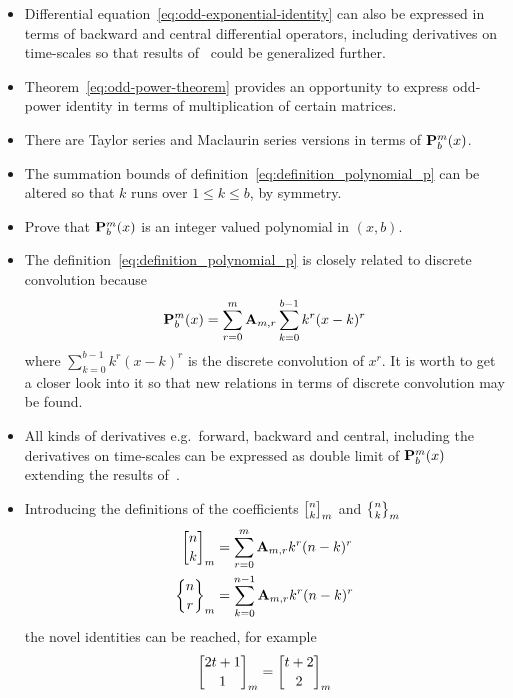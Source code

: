 \begin{itemize}
    \item Differential equation~\eqref{eq:odd-exponential-identity} can also be expressed in terms of backward
    and central differential operators, including derivatives on time-scales so that results of~\cite{study_on_partial_dynamic_eq_on_time_scales_with_poly_derivatives}
    could be generalized further.
    \item Theorem~\eqref{eq:odd-power-theorem} provides an opportunity to express odd-power identity
    in terms of multiplication of certain matrices.
    \item There are Taylor series and Maclaurin series versions in terms of ${\mathbf{P}}\sp{m} \sb{b}(x)$.
    \item The summation bounds of definition~\eqref{eq:definition_polynomial_p} can be altered so that
    $k$ runs over $1 \leq k \leq b$, by symmetry.
    \item Prove that ${\mathbf{P}}\sp{m} \sb{b}(x)$ is an integer valued polynomial in $(x,b)$.
    \item The definition~\eqref{eq:definition_polynomial_p} is closely related to discrete convolution because
    \begin{equation*}
        {\mathbf{P}}\sp{m} \sb{b}(x) = \sum_{r=0}^{m} {\mathbf{A}} \sb{m,r} \sum_{k=0}^{b-1} k^r(x-k)^r
    \end{equation*}
    where $\sum_{k=0}^{b-1} k^r(x-k)^r$ is the discrete convolution of $x^r$.
    It is worth to get a closer look into it so that new relations in terms of discrete convolution may be found.
    \item All kinds of derivatives e.g.\ forward, backward and central, including the derivatives on time-scales can be expressed
    as double limit of ${\mathbf{P}}\sp{m} \sb{b}(x)$ extending the results of~\cite{derivative_of_polynomials_via_double_limit}.
    \item Introducing the definitions of the coefficients
    ${n \brack k}_{m}$ and ${n \brace k}_{m}$
    \begin{align*}
        {n \brack k}_{m} &= \sum_{r=0}^{m} {\mathbf{A}} \sb{m,r} k^r (n-k)^r \\
        {n \brace r}_{m} &= \sum_{k=0}^{n-1} {\mathbf{A}} \sb{m,r} k^r (n-k)^r
    \end{align*}
    the novel identities can be reached, for example
    \begin{align*}
        \brackCoefficient{2t+1}{1}{m} &= \brackCoefficient{t+2}{2}{m} \\

\end{align*}
\end{itemize}
